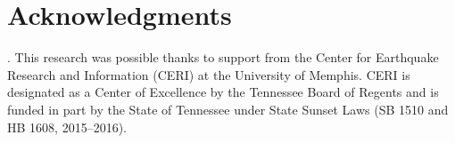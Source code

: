 
\section{Acknowledgments}
\label{sec:acknowledgments}

. This research was possible thanks to support from the Center for Earthquake Research and Information (CERI) at the University of Memphis. CERI is designated as a Center of Excellence by the Tennessee Board of Regents and is funded in part by the State of Tennessee under State Sunset Laws (SB 1510 and HB 1608, 2015--2016).
